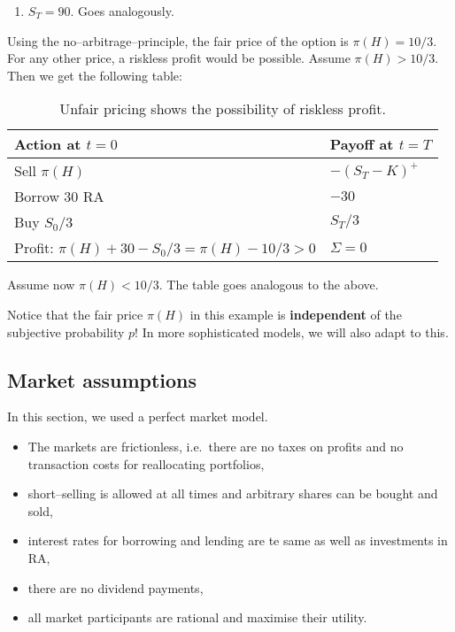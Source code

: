 \documentclass[12pt]{amsart}
\begin{document}
\begin{enumerate}
    \item \(S_T=90\). Goes analogously.
\end{enumerate}

Using the no--arbitrage--principle, the fair price of the option is \(\pi(H)=10/3\). For any other price, a riskless profit would be possible. Assume \(\pi(H) > 10/3\). Then we get the following table:

\begin{table}[h!]
    \centering
        \begin{tabular}{ll}
            \toprule
            \textbf{Action at \(t=0\)} & \textbf{Payoff at \(t=T\)} \\
            \midrule
            Sell \(\pi(H)\) & \(-(S_T-K)^+\)\\
            Borrow \(30\) RA & \(-30\)\\
            Buy \(S_0/3\) & \(S_T/3\)\\
            Profit: \(\pi(H)+30-S_0/3=\pi(H)-10/3>0\) & \(\Sigma=0\) \\
            \bottomrule
        \end{tabular}
    \caption{Unfair pricing shows the possibility of riskless profit.}
\end{table}

Assume now \(\pi(H) < 10/3\). The table goes analogous to the above.

\begin{remark}
    Notice that the fair price \(\pi(H)\) in this example is \textbf{independent} of the subjective probability \(p\)! In more sophisticated models, we will also adapt to this.
\end{remark}

\subsection{Market assumptions}

In this section, we used a perfect market model.
\begin{itemize}
    \item The markets are frictionless, i.e.\ there are no taxes on profits and no transaction costs for reallocating portfolios,
    \item short--selling is allowed at all times and arbitrary shares can be bought and sold,
    \item interest rates for borrowing and lending are te same as well as investments in RA,
    \item there are no dividend payments,
    \item all market participants are rational and maximise their utility.
\end{itemize}
\end{document}
